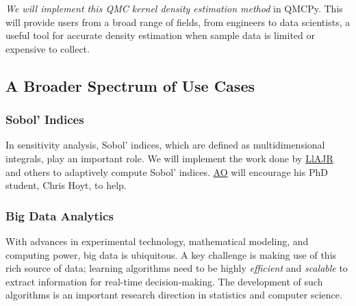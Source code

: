 \documentclass[11pt]{NSFamsart}
\newcommand{\AO}{\hyperlink{AOlink}{AO}\xspace}
\newcommand{\LlAJR}{\hyperlink{LlAJRlink}{LlAJR}\xspace}
\begin{document}
\textit{We will implement this QMC kernel density estimation method} in QMCPy. This will provide users from a broad range of fields, from engineers to data scientists, a useful tool for accurate density estimation when sample data is limited or expensive to collect.






\subsection{A Broader Spectrum of Use Cases}

\subsubsection{Sobol' Indices} In sensitivity analysis, Sobol' indices, which are defined as multidimensional integrals, play an important role.  We will implement the work done by \LlAJR and others \cite{GilEtal16a,GilJim16b} to adaptively compute Sobol' indices.  \AO will encourage his PhD student, Chris Hoyt, to help.

\subsubsection{Big Data Analytics}

With advances in experimental technology, mathematical modeling, and computing power, big data is ubiquitous.  A key challenge is making use of this rich source of data; learning algorithms need to be highly \textit{efficient} and \textit{scalable} to extract information for real-time decision-making. The development of such algorithms is an important research direction in statistics and computer science.
\end{document}
